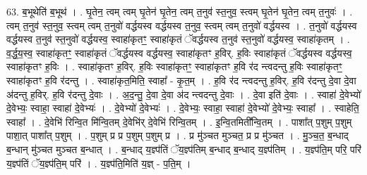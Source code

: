 \documentclass[17pt]{extarticle}
\begin{document}
63. ब॒भूथेति॑ ब॒भूथ॑ । . घृ॒तेन॒ त्वम् त्वम् घृ॒तेन॑ घृ॒तेन॒ त्वम् त॒नुव॑ स्त॒नुव॒ स्त्वम् घृ॒तेन॑ घृ॒तेन॒ त्वम् त॒नुवः॑ । . त्वम् त॒नुव॑ स्त॒नुव॒ स्त्वम् त्वम् त॒नुवो॑ वर्द्धयस्व वर्द्धयस्व त॒नुव॒ स्त्वम् त्वम् त॒नुवो॑ वर्द्धयस्व । . त॒नुवो॑ वर्द्धयस्व वर्द्धयस्व त॒नुव॑ स्त॒नुवो॑ वर्द्धयस्व॒ स्वाहा॑कृतꣳ॒॒ स्वाहा॑कृतं ॅवर्द्धयस्व त॒नुव॑ स्त॒नुवो॑ वर्द्धयस्व॒ स्वाहा॑कृतम् । . व॒र्द्ध॒य॒स्व॒ स्वाहा॑कृतꣳ॒॒ स्वाहा॑कृतं ॅवर्द्धयस्व वर्द्धयस्व॒ स्वाहा॑कृतꣳ ह॒विर्. ह॒विः स्वाहा॑कृतं ॅवर्द्धयस्व वर्द्धयस्व॒ स्वाहा॑कृतꣳ ह॒विः । . स्वाहा॑कृतꣳ ह॒विर्. ह॒विः स्वाहा॑कृतꣳ॒॒ स्वाहा॑कृतꣳ ह॒वि र॑द न्त्वदन्तु ह॒विः स्वाहा॑कृतꣳ॒॒ स्वाहा॑कृतꣳ ह॒वि र॑दन्तु । . स्वाहा॑कृत॒मिति॒ स्वाहा᳚ - कृ॒त॒म् । . ह॒वि र॑द न्त्वदन्तु ह॒विर्. ह॒वि र॑दन्तु दे॒वा दे॒वा अ॑दन्तु ह॒विर्. ह॒वि र॑दन्तु दे॒वाः । . अ॒द॒न्तु॒ दे॒वा दे॒वा अ॑द न्त्वदन्तु दे॒वाः । . दे॒वा इति॑ दे॒वाः । . स्वाहा॑ दे॒वेभ्यो॑ दे॒वेभ्यः॒ स्वाहा॒ स्वाहा॑ दे॒वेभ्यः॑ । . दे॒वेभ्यो॑ दे॒वेभ्यः॑ । . दे॒वेभ्यः॒ स्वाहा॒ स्वाहा॑ दे॒वेभ्यो॑ दे॒वेभ्यः॒ स्वाहा᳚ । . स्वाहेति॒ स्वाहा᳚ । . दे॒वेभि॑ रिन्वि॒त मि॑न्वि॒तम् दे॒वेभि॑र् दे॒वेभि॑ रिन्वि॒तम् । . इ॒न्वि॒तमिती᳚न्वि॒तम् । . पाशा᳚त् प॒शुम् प॒शुम् पाशा॒त् पाशा᳚त् प॒शुम् । . प॒शुम् प्र प्र प॒शुम् प॒शुम् प्र । . प्र मु॑ञ्चत मुञ्चत॒ प्र प्र मु॑ञ्चत । . मु॒ञ्च॒त॒ ब॒न्धाद् ब॒न्धान् मु॑ञ्चत मुञ्चत ब॒न्धात् । . ब॒न्धाद् य॒ज्ञ्प॑तिं ॅय॒ज्ञ्प॑तिम् ब॒न्धाद् ब॒न्धाद् य॒ज्ञ्प॑तिम् । . य॒ज्ञ्प॑ति॒म् परि॒ परि॑ य॒ज्ञ्प॑तिं ॅय॒ज्ञ्प॑ति॒म् परि॑ । . य॒ज्ञ्प॑ति॒मिति॑ य॒ज्ञ् - प॒ति॒म् । \newline
\end{document}
